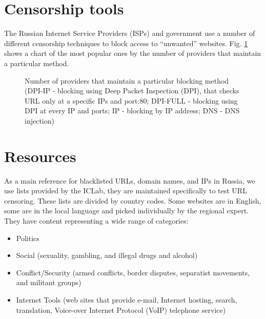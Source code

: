 \documentclass[conference]{IEEEtran}
\begin{document}
\section{Censorship tools}
The Russian Internet Service Providers (ISPs) and government use a number of different censorship techniques to block access to ``unwanted'' websites. 
Fig. \ref{fig:fig1} shows a chart of the most popular ones by the number of providers that maintain a particular method.
\begin{figure}[H]
    \centering
    \caption{Number of providers that maintain a particular blocking method (DPI-IP - blocking using Deep Packet Inspection (DPI), that checks URL only at a specific IPs and port:80; DPI-FULL - blocking using DPI at every IP and ports; IP - blocking by IP address; DNS - DNS injection)}
    \label{fig:fig1}
\end{figure}

\section{Resources}
\indent As a main reference for blacklisted URLs, domain names, and IPs in Russia, we use lists provided by the ICLab, they are maintained specifically to test URL censoring. These lists are divided by country codes. Some websites are in English, some are in the local language and picked individually by the regional expert. They have content representing a wide range of categories:
\begin{itemize}
            \item Politics
            \item Social (sexuality, gambling, and illegal drugs and alcohol)
            \item Conflict/Security (armed conflicts, border disputes, separatist movements, and militant groups)
            \item Internet Tools (web sites that provide e-mail, Internet hosting, search, translation, Voice-over Internet Protocol (VoIP) telephone service)
\end{itemize}
\end{document}
